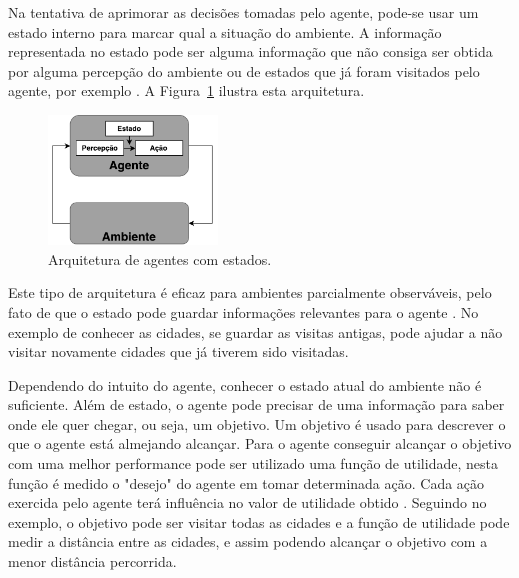 Na tentativa de aprimorar as decisões tomadas pelo agente, pode-se usar um estado interno para marcar qual a situação do ambiente. A informação representada no estado pode ser alguma informação que não consiga ser obtida por alguma percepção do ambiente ou de estados que já foram visitados pelo agente, por exemplo \cite{intelligence2003modern}. A Figura~\ref{fig:agenteModelbased} ilustra esta arquitetura. 

\begin{figure}[ht]
	\centering
	\includegraphics[width=0.4\textwidth]{fig/agentModel.pdf}
	\caption{Arquitetura de agentes com estados.}
	\label{fig:agenteModelbased}
\end{figure} 

Este tipo de arquitetura é eficaz para ambientes parcialmente observáveis, pelo fato de que o estado pode guardar informações relevantes para o agente \cite{intelligence2003modern}. No exemplo de conhecer as cidades, se guardar as visitas antigas, pode ajudar a não visitar novamente cidades que já tiverem sido visitadas. 

Dependendo do intuito do agente, conhecer o estado atual do ambiente não é suficiente. Além de estado, o agente pode precisar de uma informação para saber onde ele quer chegar, ou seja, um objetivo. Um objetivo é usado para descrever o que o agente está almejando alcançar. Para o agente conseguir alcançar o objetivo com uma melhor performance pode ser utilizado uma função de utilidade, nesta função é medido o "desejo" do agente em tomar determinada ação. Cada ação exercida pelo agente terá influência no valor de utilidade obtido \cite{intelligence2003modern}. Seguindo no exemplo, o objetivo pode ser visitar todas as cidades e a função de utilidade pode medir a distância entre as cidades, e assim podendo alcançar o objetivo com a menor distância percorrida. 


